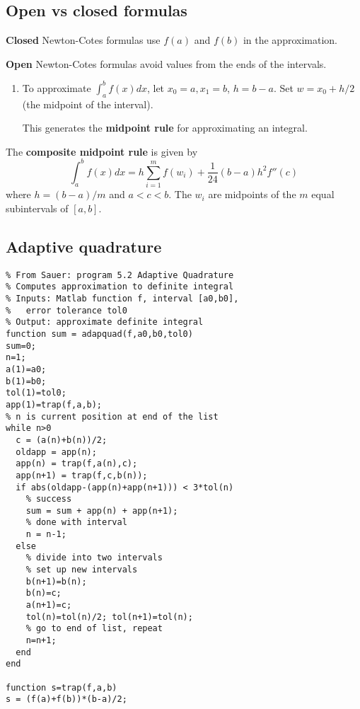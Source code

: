 \documentclass[12pt,letterpaper,noanswers]{exam}
\begin{document}
\subsection*{Open vs closed formulas}
\begin{tcolorbox}
\textbf{Closed} Newton-Cotes formulas use $f(a)$ and $f(b)$ in the approximation.

\textbf{Open} Newton-Cotes formulas avoid values from the ends of the intervals.
\end{tcolorbox}
\begin{enumerate}[resume=classQ]
    \item To approximate $\displaystyle\int_a^b f(x)dx$, let $x_0 = a, x_1 = b$, $h = b-a$.  Set $w = x_0 + h/2$ (the midpoint of the interval).
This generates the \textbf{midpoint rule} for approximating an integral.
\end{enumerate}
\begin{tcolorbox}
The \textbf{composite midpoint rule} is given by \[\int_a^bf(x)dx = h\sum\limits_{i=1}^m f(w_i) + \frac{1}{24}(b-a)h^2 f''(c)\] where $h = (b-a)/m$ and $a<c<b$.  The $w_i$ are midpoints of the $m$ equal subintervals of $[a,b]$.
\end{tcolorbox}

\subsection*{Adaptive quadrature}

\begin{lstlisting}
% From Sauer: program 5.2 Adaptive Quadrature
% Computes approximation to definite integral
% Inputs: Matlab function f, interval [a0,b0], 
%   error tolerance tol0
% Output: approximate definite integral
function sum = adapquad(f,a0,b0,tol0)
sum=0; 
n=1; 
a(1)=a0; 
b(1)=b0; 
tol(1)=tol0; 
app(1)=trap(f,a,b);
% n is current position at end of the list
while n>0           
  c = (a(n)+b(n))/2;
  oldapp = app(n);
  app(n) = trap(f,a(n),c);
  app(n+1) = trap(f,c,b(n));
  if abs(oldapp-(app(n)+app(n+1))) < 3*tol(n)
    % success
	sum = sum + app(n) + app(n+1);
	% done with interval
	n = n-1;                         
  else
    % divide into two intervals
    % set up new intervals
	b(n+1)=b(n); 
	b(n)=c;
	a(n+1)=c;
	tol(n)=tol(n)/2; tol(n+1)=tol(n);
	% go to end of list, repeat
	n=n+1;                         
  end
end

function s=trap(f,a,b)
s = (f(a)+f(b))*(b-a)/2;

\end{lstlisting}
\end{document}
